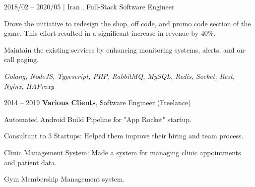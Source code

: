     \begin{twocolentry}{2018/02 -- 2020/05 | Iran}
        , Full-Stack Software Engineer
    \end{twocolentry}
    \begin{onecolentry}
        \begin{highlights}
            \item Drove the initiative to redesign the shop, off code, and promo code section of the game. This effort resulted in a significant increase in revenue by 40\%.
            \item Maintain the existing services by enhancing monitoring systems, alerts, and on-call paging.
        \end{highlights}
        \textit{Golang, NodeJS, Typescript, PHP, RabbitMQ, MySQL, Redis, Socket, Rest, Nginx, HAProxy}
    \end{onecolentry}
    \vspace{0.3cm}


    \begin{twocolentry}{2014 -- 2019}
        \textbf{Various Clients}, Software Engineer (Freelance)
    \end{twocolentry}
    \begin{onecolentry}
        \begin{highlights}
            \item Automated Android Build Pipeline for "App Rocket" startup.
            \item Consultant to 3 Startups: Helped them improve their hiring and team process.
            \item Clinic Management System: Made a system for managing clinic appointments and patient data.
            \item Gym Membership Management system.
        \end{highlights}
    \end{onecolentry}
